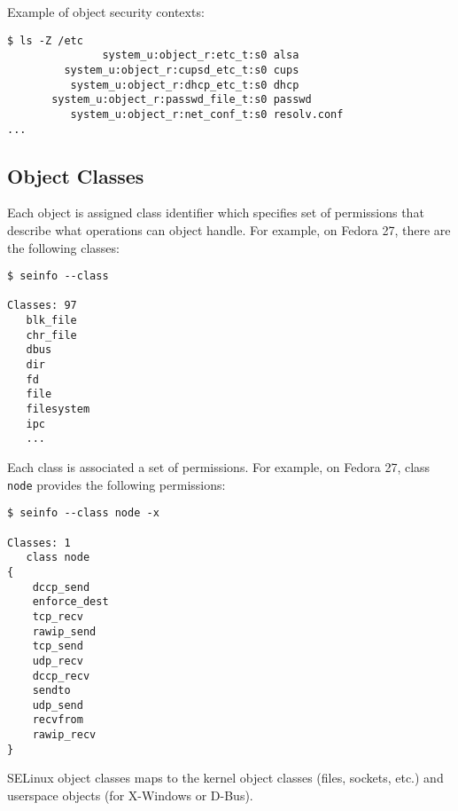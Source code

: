 Example of object security contexts:
\begin{lstlisting}
$ ls -Z /etc
               system_u:object_r:etc_t:s0 alsa
         system_u:object_r:cupsd_etc_t:s0 cups
          system_u:object_r:dhcp_etc_t:s0 dhcp
       system_u:object_r:passwd_file_t:s0 passwd
          system_u:object_r:net_conf_t:s0 resolv.conf
...
\end{lstlisting}

\subsection{Object Classes}

Each object is assigned class identifier which specifies set of permissions that
describe what operations can object handle. For example, on Fedora 27, there are
the following classes:
\begin{lstlisting}
$ seinfo --class

Classes: 97
   blk_file
   chr_file
   dbus
   dir
   fd
   file
   filesystem
   ipc
   ...
\end{lstlisting}

Each class is associated a set of permissions. For example, on Fedora 27, class
\texttt{node} provides the following permissions:
\begin{lstlisting}
$ seinfo --class node -x

Classes: 1
   class node
{
	dccp_send
	enforce_dest
	tcp_recv
	rawip_send
	tcp_send
	udp_recv
	dccp_recv
	sendto
	udp_send
	recvfrom
	rawip_recv
}
\end{lstlisting}
SELinux object classes maps to the kernel object classes (files, sockets, etc.)
and userspace objects (for X-Windows or D-Bus).

